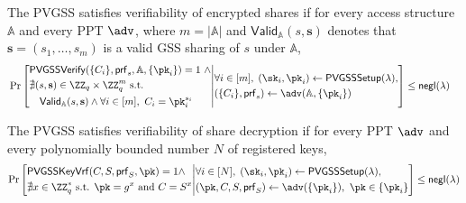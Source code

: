 \documentclass[runningheads]{llncs}
\newcommand{\pvgssSetup}{\mathsf{PVGSSSetup}}
\newcommand{\pvgssVerify}{\mathsf{PVGSSVerify}}
\newcommand{\pvgssKeyVrf}{\mathsf{PVGSSKeyVrf}}
\newcommand{\proofs}{\mathsf{prf}}
\begin{document}
\begin{definition}\label{def:Ver_enc_share}
    The PVGSS satisfies verifiability of encrypted shares if for every access
    structure \(\mathbb{A}\) and every PPT \(\adv\), where \(m=|\mathbb{A}|\)
    and \(\mathsf{Valid}_{\mathbb{A}}(s,\mathbf{s})\) denotes that
    \(\mathbf{s}=(s_1,\ldots,s_m)\) is a valid GSS sharing of \(s\) under
    \(\mathbb{A}\),
    {\small \[
    \begin{aligned}
    &\Pr\left[
    \begin{aligned}
      &\pvgssVerify(\{C_i\},\proofs_s,\mathbb{A},\{\pk_i\})=1
      \ \land \\
      &\nexists (s,\mathbf{s})\in\ZZ_q\times\ZZ_q^m\ \text{s.t.}\\
      &\quad \mathsf{Valid}_{\mathbb{A}}(s,\mathbf{s})
      \land \forall i\in[m],\ C_i=\pk_i^{s_i}
    \end{aligned}
        \middle|
    \begin{aligned}
    &\forall i\in[m],\;(\sk_i,\pk_i)\gets \pvgssSetup(\lambda),\\
    &(\{C_i\},\proofs_s)\gets \adv(\mathbb{A},\{\pk_i\})
    \end{aligned}
    \right]
    \leq \mathsf{negl}(\lambda)
    \end{aligned}
    \]}
\end{definition}

\begin{definition}\label{def:Ver_dec_share}
    The PVGSS satisfies verifiability of share decryption if for every PPT $\adv$ and every polynomially bounded number $N$ of registered keys,
    { \[
    \Pr\left[
    \begin{aligned}
    &\pvgssKeyVrf(C, S, \proofs_{S}, \pk) = 1 \land \\
    & \nexists x \in \ZZ_q^* \ \text{s.t. } \pk=g^x \text{ and } C=S^x\\
    \end{aligned}
        \middle|
    \begin{aligned}
    &\forall i\in[N],\;(\sk_i,\pk_i) \gets \pvgssSetup(\lambda), \\
    &(\pk,C,S,\proofs_{S}) \gets \adv(\{\pk_i\}), \ \pk \in \{\pk_i\}
    \end{aligned}
    \right]
    \leq \mathsf{negl}(\lambda)\]}
\end{definition}
\end{document}
